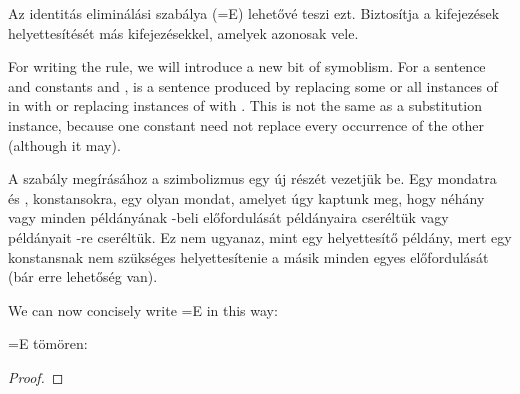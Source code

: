Az identitás eliminálási szabálya ({=}E) lehetővé teszi ezt. Biztosítja a kifejezések helyettesítését más kifejezésekkel, amelyek azonosak vele.

For writing the rule, we will introduce a new bit of symoblism. For a sentence  and constants  and ,  is a sentence produced by replacing some or all instances of  in  with  or replacing instances of  with . This is not the same as a substitution instance, because one constant need not replace every occurrence of the other (although it may).

A szabály megírásához a szimbolizmus egy új részét vezetjük be. Egy  mondatra és ,  konstansokra,  egy olyan mondat, amelyet úgy kaptunk meg, hogy  néhány vagy minden példányának -beli előfordulását  példányaira cseréltük vagy  példányait -re cseréltük. Ez nem ugyanaz, mint egy helyettesítő példány, mert egy konstansnak nem szükséges helyettesítenie a másik minden egyes előfordulását (bár erre lehetőség van).

We can now concisely write {=}E in this way:

{=}E tömören:

\begin{proof}
	 
\end{proof}
\nopagebreak







